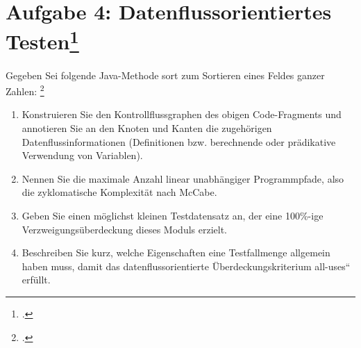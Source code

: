 \documentclass{lehramt-informatik-minimal}
\begin{document}
\section{Aufgabe 4: Datenflussorientiertes Testen\footcite{sosy:ab:7}}

Gegeben Sei folgende Java-Methode sort zum Sortieren eines Feldes ganzer
Zahlen:
\footcite[Herbst 2016 (66116) - Thema 1, Teilaufgabe 2, Aufgabe 3 a-e]{examen:66116:2016:09}


\begin{enumerate}


\item Konstruieren Sie den Kontrollflussgraphen des obigen
Code-Fragments und annotieren Sie an den Knoten und Kanten die
zugehörigen Datenflussinformationen (Definitionen bzw. berechnende
oder prädikative Verwendung von Variablen).


\item Nennen Sie die maximale Anzahl linear unabhängiger Programmpfade,
also die zyklomatische Komplexität nach McCabe.


\item Geben Sie einen möglichst kleinen Testdatensatz an, der eine
100\%-ige Verzweigungsüberdeckung dieses Moduls erzielt.


\item Beschreiben Sie kurz, welche Eigenschaften eine Testfallmenge
allgemein haben muss, damit das datenflussorientierte
Überdeckungskriterium all-uses“ erfüllt.

\end{enumerate}
\end{document}
